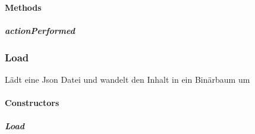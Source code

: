 \documentclass[letterpaper,10pt,ngerman]{sphinxmanual}
\begin{document}
\paragraph{Methods}
\label{\detokenize{com/linuxluigi/edu/Controller-NodeListener:methods}}

\subparagraph{actionPerformed}
\label{\detokenize{com/linuxluigi/edu/Controller-NodeListener:actionperformed}}

\begin{fulllineitems}
\label{\detokenize{com/linuxluigi/edu/Controller-NodeListener:com.linuxluigi.edu.Controller.NodeListener.actionPerformed(ActionEvent)}}
\end{fulllineitems}



\subsubsection{Load}
\label{\detokenize{com/linuxluigi/edu/Load:load}}\label{\detokenize{com/linuxluigi/edu/Load::doc}}

\begin{fulllineitems}
\label{\detokenize{com/linuxluigi/edu/Load:com.linuxluigi.edu.Load}}
Lädt eine Json Datei und wandelt den Inhalt in ein Binärbaum um

\end{fulllineitems}



\paragraph{Constructors}
\label{\detokenize{com/linuxluigi/edu/Load:constructors}}

\subparagraph{Load}
\label{\detokenize{com/linuxluigi/edu/Load:id1}}
\end{document}
